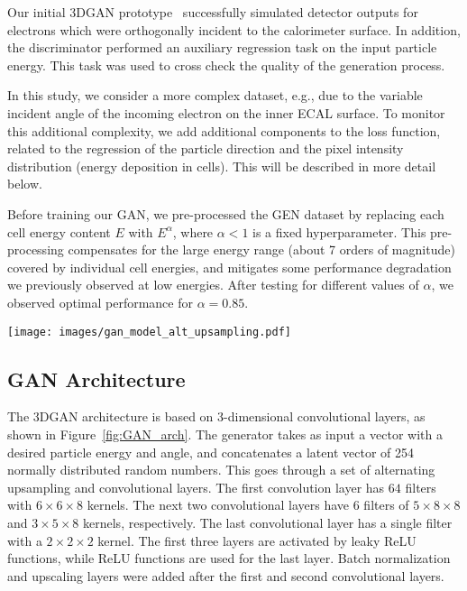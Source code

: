  Our initial 3DGAN prototype~\cite{NIPS} successfully simulated detector outputs for electrons which were orthogonally incident to the calorimeter surface. In addition, the discriminator performed an auxiliary regression task on the input particle energy. This task was used to cross check the quality of the generation process. 
 
 In this study, we consider a more complex dataset, e.g., due to the variable incident angle of the incoming electron on the inner ECAL surface. To monitor this additional complexity, we add additional components to the loss function, related to the regression of the particle direction and the pixel intensity distribution (energy deposition in cells). This will be described in more detail below.

Before training our GAN, we pre-processed the GEN dataset by replacing each cell energy content $E$ with $E^\alpha$, where $\alpha<1$ is a fixed hyperparameter. This pre-processing compensates for the large energy range (about 7 orders of magnitude) covered by individual cell energies, and mitigates some performance degradation we previously observed at low energies. After testing for different values of $\alpha$, we observed optimal performance for $\alpha=0.85$.

\begin{figure*}[htbp]
\centering
    \texttt{[image: images/gan\_model\_alt\_upsampling.pdf]}
    \caption{3DGAN generator and discriminator network architectures}
    \label{fig:GAN_arch}
\end{figure*}

\subsection{GAN Architecture}
\label{sec:GANarch}

The 3DGAN architecture is based on 3-dimensional convolutional layers, as shown in Figure~\ref{fig:GAN_arch}. The generator takes as input a vector with a desired particle energy and angle, and concatenates a latent vector of 254 normally distributed random numbers. This goes through a set of alternating upsampling and convolutional layers. The first convolution layer has $64$ filters with $6 \times 6 \times 8$ kernels. The next two convolutional layers have $6$ filters of $5 \times 8 \times 8$ and $3 \times 5 \times 8$ kernels, respectively. The last convolutional layer has a single filter with a $2 \times 2 \times 2$ kernel. The first three layers are activated by leaky ReLU functions, while ReLU functions are used for the last layer. Batch normalization and upscaling layers were added after the first and second convolutional layers.

